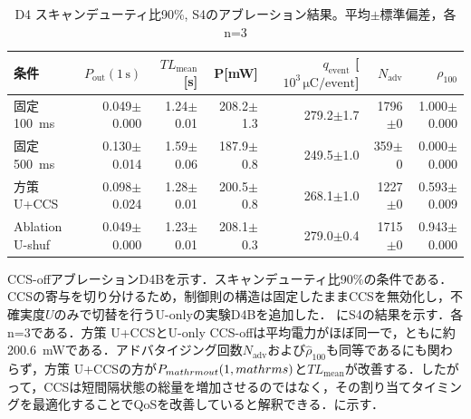 \begin{table}[tb]
  \centering
  \caption{D4 スキャンデューティ比90\%, S4のアブレーション結果。平均$\pm$標準偏差，各n=3}
  \label{tab:d4_summary}
  {\small
  \setlength{\tabcolsep}{4pt}
  \begin{tabular}{lrrrrrr}
    \toprule
    条件 & $P_{\mathrm{out}}(1\,\mathrm{s})$ & $TL_{\mathrm{mean}}$[s] & P[mW] & $q_{\mathrm{event}}$ [$10^3\,\si{\micro\coulomb}/\text{event}$] & $N_{\mathrm{adv}}$ & $\rho_{100}$ \\
    \midrule
    固定\SI{100}{\milli\second} & 0.049$\pm$0.000 & 1.24$\pm$0.01 & 208.2$\pm$1.3 & 279.2$\pm$1.7 & 1796$\pm$0 & 1.000$\pm$0.000 \\
    固定\SI{500}{\milli\second} & 0.130$\pm$0.014 & 1.59$\pm$0.06 & 187.9$\pm$0.8 & 249.5$\pm$1.0 & 359$\pm$0 & 0.000$\pm$0.000 \\
    \shortstack{方策\\U+CCS} & 0.098$\pm$0.024 & 1.28$\pm$0.01 & 200.5$\pm$0.8 & 268.1$\pm$1.0 & 1227$\pm$0 & 0.593$\pm$0.009 \\
    \shortstack{Ablation\\U-shuf} & 0.049$\pm$0.000 & 1.23$\pm$0.01 & 208.1$\pm$0.3 & 279.0$\pm$0.4 & 1715$\pm$0 & 0.943$\pm$0.000 \\
    \bottomrule
  \end{tabular}
  }
\end{table}
CCS-offアブレーションD4Bを示す．スキャンデューティ比90\%の条件である．
\label{sec:d4b_ccs_off}
CCSの寄与を切り分けるため，制御則の構造は固定したままCCSを無効化し，不確実度$U$のみで切替を行うU-onlyの実験D4Bを追加した．
にS4の結果を示す．各n=3である．方策 U+CCSとU-only CCS-offは平均電力がほぼ同一で，ともに約\SI{200.6}{\milli\watt}である．アドバタイジング回数$N_{\mathrm{adv}}$および$\hat{\rho}_{100}$も同等であるにも関わらず，方策 U+CCSの方が$P_{\\mathrm{out}}(1\\,\\mathrm{s})$と$TL_{\mathrm{mean}}$が改善する．したがって，CCSは短間隔状態の総量を増加させるのではなく，その割り当てタイミングを最適化することでQoSを改善していると解釈できる．に示す．

